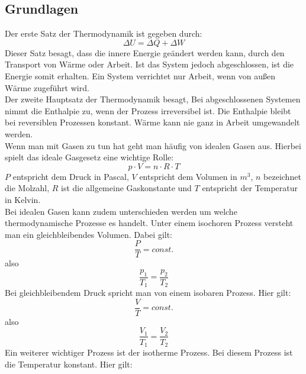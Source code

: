 \documentclass[12pt,a4paper]{scrartcl}
\begin{document}
\subsection{Grundlagen}
Der erste Satz der Thermodynamik ist gegeben durch:\\
\begin{equation}
\Delta U = \Delta Q + \Delta W
\end{equation}
Dieser Satz besagt, dass die innere Energie geändert werden kann, durch den Transport von Wärme oder Arbeit. Ist das System jedoch abgeschlossen, ist die Energie somit erhalten. Ein System verrichtet nur Arbeit, wenn von außen Wärme zugeführt wird.\\
Der zweite Hauptsatz der Thermodynamik besagt, Bei abgeschlossenen Systemen nimmt die Enthalpie zu, wenn der Prozess irreversibel ist. Die Enthalpie bleibt bei reversiblen Prozessen konstant. Wärme kann nie ganz in Arbeit umgewandelt werden.\\
Wenn man mit Gasen zu tun hat geht man häufig von idealen Gasen aus. Hierbei spielt das ideale Gasgesetz eine wichtige Rolle:\\
\begin{equation}
p \cdot V=n \cdot R\cdot T
\end{equation}
$P$ entspricht dem Druck in Pascal, $V$ entspricht dem Volumen in $m^3$, $n$ bezeichnet die Molzahl, $R$ ist die allgemeine Gaskonstante und $T$ entspricht der Temperatur in Kelvin.\\
Bei idealen Gasen kann zudem unterschieden werden um welche thermodynamische Prozesse es handelt. Unter einem isochoren Prozess versteht man ein gleichbleibendes Volumen. Dabei gilt:\\
\begin{equation}
\frac{P}{T}= const.
\end{equation}
 also
 \begin{equation}
 \frac{p_1}{T_1}= \frac{p_2}{T_2}
 \end{equation}
Bei gleichbleibendem Druck spricht man von einem isobaren Prozess. Hier gilt:\\
\begin{equation}
\frac{V}{T}= const.
\end{equation}
 also 
 \begin{equation}
  \frac{ V_1}{T_1}= \frac{V_2}{T_2}
 \end{equation}
Ein weiterer wichtiger Prozess ist der isotherme Prozess. Bei diesem Prozess ist die Temperatur konstant. Hier gilt:\\
\end{document}
